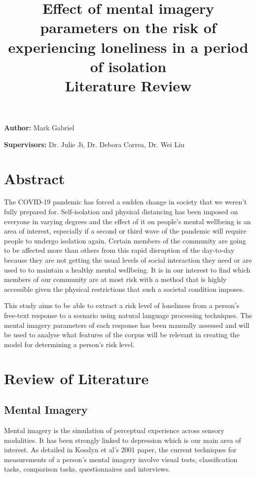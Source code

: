 \documentclass[12pt, a4paper]{article}
\title{%
	Effect of mental imagery parameters on the risk of experiencing loneliness in a period of isolation \\
	\large Literature Review}
\author{}
\date{}
\newcommand{\namelistlabel}[1]{\mbox{#1}\hfil}
\newenvironment{namelist}[1]{%
\begin{list}{}
    {
        \let\makelabel\namelistlabel
        \settowidth{\labelwidth}{#1}
        \setlength{\leftmargin}{1.1\labelwidth}
    }
  }{%
\end{list}}
\begin{document}
\maketitle

\begin{namelist}{xxxxxxxxxxxx}
\item[{\bf Author:}]
	Mark Gabriel
\item[{\bf Supervisors:}]
	Dr. Julie Ji, Dr. Debora Correa, Dr. Wei Liu
\end{namelist}

\section{Abstract} The COVID-19 pandemic has forced a sudden change in society that we weren't fully prepared for.  Self-isolation and physical distancing has been imposed on everyone in varying degrees and the effect of it on people's mental wellbeing is an area of interest, especially if a second or third wave of the pandemic will require people to undergo isolation again. Certain members of the community are going to be affected more than others from this rapid disruption of the day-to-day because they are not getting the usual levels of social interaction they need or are used to to maintain a healthy mental wellbeing. It is in our interest to find which members of our community are at most risk with a method that is highly accessible given the physical restrictions that such a societal condition imposes. 

This study aims to be able to extract a risk level of loneliness from a person's free-text response to a scenario using natural language processing techniques. The mental imagery parameters of each response has been manually assessed and will be used to analyse what features of the corpus will be relevant in creating the model for determining a person's risk level. 

\section{Review of Literature}

\subsection{Mental Imagery}
Mental imagery is the simulation of perceptual experience \cite{Kosslyn2001} across sensory modalities. It has been strongly linked to depression \cite{Patel2005} which is our main area of interest. As detailed in Kosslyn et al's 2001 paper, the current techniques for measurements of a person's mental imagery involve visual tests, classification tasks, comparison tasks, questionnaires and interviews. 
\end{document}
